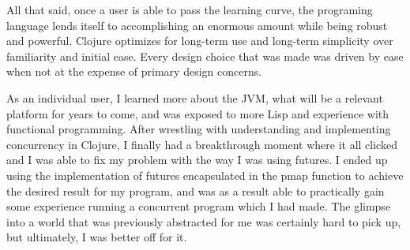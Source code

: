     All that said, once a user is able to pass the learning curve, the programing language lends itself to accomplishing an enormous amount while being robust and powerful. Clojure optimizes for long-term use and long-term simplicity over familiarity and initial ease. Every design choice that was made was driven by ease when not at the expense of primary design concerns.
    
    As an individual user, I learned more about the JVM, what will be a relevant platform for years to come, and was exposed to more Lisp and experience with functional programming. After wrestling with understanding and implementing concurrency in Clojure, I finally had a breakthrough moment where it all clicked and I was able to fix my problem with the way I was using futures. I ended up using the implementation of futures encapsulated in the pmap function to achieve the desired result for my program, and was as a result able to practically gain some experience running a concurrent program which I had made. The glimpse into a world that was previously abstracted for me was certainly hard to pick up, but ultimately, I was better off for it.